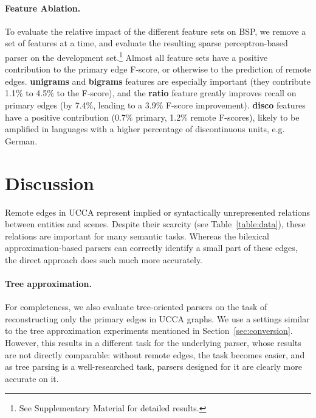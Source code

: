 \documentclass[11pt]{article}
\newcommand{\secref}[1]{Section~\ref{#1}}
\newcommand{\tabref}[1]{Table~\ref{#1}}
\begin{document}
\paragraph{Feature Ablation.}
To evaluate the relative impact of the different feature sets on BSP,
we remove a set of features at a time,
and evaluate the resulting sparse perceptron-based parser on the development set.\footnote{See
Supplementary Material for detailed results.}
Almost all feature sets have a positive contribution to the primary edge F-score, 
or otherwise to the prediction of remote edges.
\textbf{unigrams} and \textbf{bigrams} features are especially
important (they contribute 1.1\% to 4.5\% to the F-score),
and the \textbf{ratio} feature greatly improves recall on
primary edges (by 7.4\%, leading to  a 3.9\% F-score improvement).
\textbf{disco} features have a positive contribution
(0.7\% primary, 1.2\% remote F-scores),
likely to be amplified in languages with a higher percentage of discontinuous units, e.g. German.

\section{Discussion}\label{sec:discussion}

Remote edges in UCCA represent implied or syntactically unrepresented relations between entities
and scenes.
Despite their scarcity (see \tabref{table:data}), these relations are important for many semantic
tasks.
Whereas the bilexical approximation-based parsers can correctly identify a small part of these
edges, the direct approach does such much more accurately.

\paragraph{Tree approximation.}
For completeness, we also evaluate tree-oriented parsers on the task of reconstructing
only the primary edges in UCCA graphs.
We use a settings similar to the tree approximation experiments mentioned in \secref{sec:conversion}.
However, this results in a different task for the underlying parser, whose results are not directly
comparable:
without remote edges, the task becomes easier, and
as tree parsing is a well-researched task, parsers designed for it are clearly more accurate on it.
\end{document}
